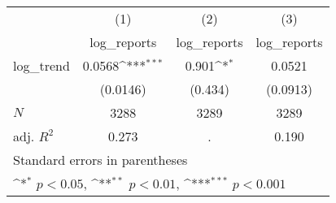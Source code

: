 {
\def\sym#1{\ifmmode^{#1}\else\(^{#1}\)\fi}
\begin{tabular}{l*{3}{c}}
\hline\hline
            &\multicolumn{1}{c}{(1)}&\multicolumn{1}{c}{(2)}&\multicolumn{1}{c}{(3)}\\
            &\multicolumn{1}{c}{log\_reports}&\multicolumn{1}{c}{log\_reports}&\multicolumn{1}{c}{log\_reports}\\
\hline
log\_trend   &      0.0568\sym{***}&       0.901\sym{*}  &      0.0521         \\
            &    (0.0146)         &     (0.434)         &    (0.0913)         \\
\hline
\(N\)       &        3288         &        3289         &        3289         \\
adj. \(R^{2}\)&       0.273         &           .         &       0.190         \\
\hline\hline
\multicolumn{4}{l}{\footnotesize Standard errors in parentheses}\\
\multicolumn{4}{l}{\footnotesize \sym{*} \(p<0.05\), \sym{**} \(p<0.01\), \sym{***} \(p<0.001\)}\\
\end{tabular}
}
